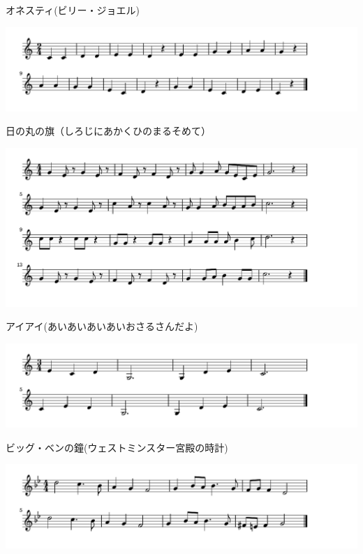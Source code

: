 \documentclass[a4paper]{ltjsarticle}
\begin{document}
\vspace{-10mm} \hspace{10mm}
オネスティ(ビリー・ジョエル)

\includegraphics[clip]{hinomaru_crop.pdf}

\vspace{-10mm} \hspace{10mm}
日の丸の旗（しろじにあかくひのまるそめて）

\includegraphics[clip]{aiai_crop.pdf}

\vspace{-10mm} \hspace{10mm}
アイアイ(あいあいあいあいおさるさんだよ)

\includegraphics[clip]{bigben_crop.pdf}

\vspace{-10mm} \hspace{10mm}
ビッグ・ベンの鐘(ウェストミンスター宮殿の時計)

\includegraphics[clip]{lamourestbleu_crop.pdf}
\end{document}
